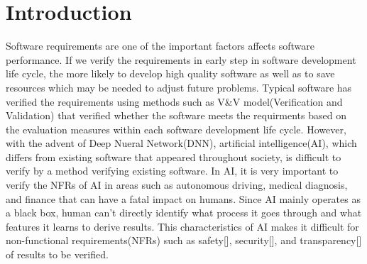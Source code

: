 \documentclass[journal,article,submit,moreauthors,pdftex]{Definitions/mdpi}
\begin{document}
\setcounter{section}%


\section{Introduction}
 
Software requirements are one of the important factors affects software performance.
If we verify the requirements in early step in software development life cycle, the more likely to develop high quality software as well as to save resources which may be needed to adjust future problems.
Typical software has verified the requirements using methods such as V\&V model(Verification and Validation) that verified whether the software meets the requirments based on the evaluation measures within each software development life cycle.
However, with the advent of Deep Nueral Network(DNN), artificial intelligence(AI), which differs from existing software that appeared throughout society, is difficult to verify by a method verifying existing software.
In AI, it is very important to verify the NFRs of AI in areas such as autonomous driving, medical diagnosis, and finance that can have a fatal impact on humans.
Since AI mainly operates as a black box, human can't directly identify what process it goes through and what features it learns to derive results.
This characteristics of AI makes it difficult for non-functional requirements(NFRs) such as safety[], security[], and transparency[] of results to be verified.
\end{document}

